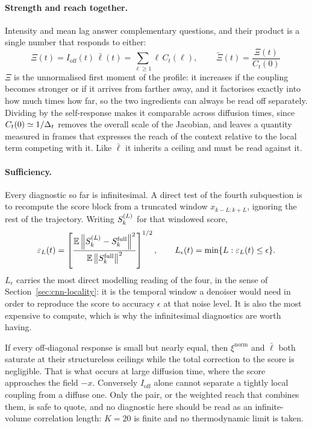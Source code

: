 \paragraph{Strength and reach together.} Intensity and mean lag answer
complementary questions, and their product is a single number that responds to
either:
\begin{equation}
  \Xi(t) = I_{\mathrm{off}}(t)\, \bar\ell(t)
         = \sum_{\ell\ge1} \ell\, C_t(\ell) ,
  \qquad
  \boxed{\ \widetilde\Xi(t) = \frac{\Xi(t)}{C_t(0)}\ }
  \label{eq:ring-weighted-reach}
\end{equation}
$\Xi$ is the unnormalised first moment of the profile: it increases if the
coupling becomes stronger or if it arrives from farther away, and it factorises
exactly into how much times how far, so the two ingredients can always be read
off separately. Dividing by the self-response makes it comparable across
diffusion times, since $C_t(0) \simeq 1/\Delta_t$ removes the overall scale of
the Jacobian, and leaves a quantity measured in frames that expresses the reach
of the context relative to the local term competing with it. Like $\bar\ell$ it
inherits a ceiling and must be read against it.

\paragraph{Sufficiency.} Every diagnostic so far is infinitesimal. A direct
test of the fourth subquestion is to recompute the score block from a truncated
window $x_{k-L:k+L}$, ignoring the rest of the trajectory. Writing
$S^{(L)}_k$ for that windowed score,
\begin{equation}
  \varepsilon_L(t)
  = \left[
      \frac{\mathbb{E} \left\lVert S^{(L)}_k - S^{\mathrm{full}}_k \right\rVert^2}
           {\mathbb{E} \left\lVert S^{\mathrm{full}}_k \right\rVert^2}
    \right]^{1/2} ,
  \qquad
  L_\epsilon(t) = \min\{ L : \varepsilon_L(t) \le \epsilon \} .
  \label{eq:ring-window}
\end{equation}
$L_\epsilon$ carries the most direct modelling reading of the four, in the sense
of Section~\ref{sec:cnn-locality}: it is the temporal window a denoiser would
need in order to reproduce the score to accuracy $\epsilon$ at that noise
level. It is also the most expensive to compute, which is why the
infinitesimal diagnostics are worth having.

\begin{remark}\label{rem:ring-ceiling}
If every off-diagonal response is small but nearly equal, then
$\xi^{\mathrm{norm}}$ and $\bar\ell$ both saturate at their structureless
ceilings while the total correction to the score is negligible. That is what
occurs at large diffusion time, where the score approaches the field $-x$.
Conversely $I_{\mathrm{off}}$ alone cannot separate a tightly local coupling
from a diffuse one. Only the pair, or the weighted reach that combines them, is
safe to quote, and no diagnostic here should be read as an infinite-volume
correlation length: $K = 20$ is finite and no thermodynamic limit is taken.
\end{remark}

